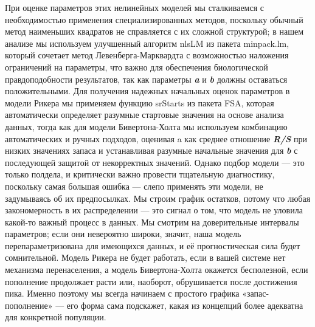\documentclass[
  letterpaper,
  DIV=11,
  numbers=noendperiod]{scrreprt}
\begin{document}
При оценке параметров этих нелинейных моделей мы сталкиваемся с
необходимостью применения специализированных методов, поскольку обычный
метод наименьших квадратов не справляется с их сложной структурой; в
нашем анализе мы используем улучшенный алгоритм nlsLM из пакета
minpack.lm, который сочетает метод Левенберга-Марквардта с возможностью
наложения ограничений на параметры, что важно для обеспечения
биологической правдоподобности результатов, так как параметры
\textbf{\emph{a}} и \textbf{\emph{b}} должны оставаться положительными.
Для получения надежных начальных оценок параметров в модели Рикера мы
применяем функцию srStarts из пакета FSA, которая автоматически
определяет разумные стартовые значения на основе анализа данных, тогда
как для модели Бивертона-Холта мы используем комбинацию автоматических и
ручных подходов, оценивая a как среднее отношение \textbf{\emph{R/S}}
при низких значениях запаса и устанавливая разумные начальные значения
для \textbf{\emph{b}} с последующей защитой от некорректных значений.
Однако подбор модели --- это только полдела, и критически важно провести
тщательную диагностику, поскольку самая большая ошибка --- слепо
применять эти модели, не задумываясь об их предпосылках. Мы строим
график остатков, потому что любая закономерность в их распределении ---
это сигнал о том, что модель не уловила какой-то важный процесс в
данных. Мы смотрим на доверительные интервалы параметров; если они
невероятно широки, значит, наша модель перепараметризована для имеющихся
данных, и её прогностическая сила будет сомнительной. Модель Рикера не
будет работать, если в вашей системе нет механизма перенаселения, а
модель Бивертона-Холта окажется бесполезной, если пополнение продолжает
расти или, наоборот, обрушивается после достижения пика. Именно поэтому
мы всегда начинаем с простого графика «запас-пополнение» --- его форма
сама подскажет, какая из концепций более адекватна для конкретной
популяции.
\end{document}
